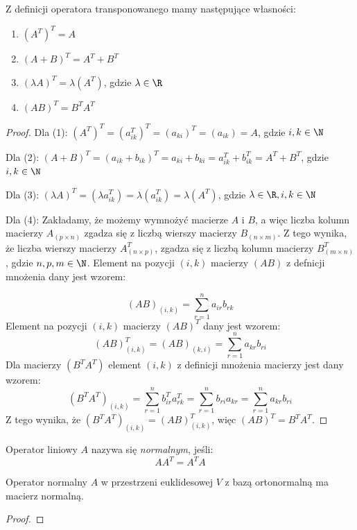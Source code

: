 \begin{theorem}\label{theorem:properties_of_transposed_operator}
    Z definicji operatora transponowanego mamy następujące własności:
    \begin{enumerate}[leftmargin=1cm, itemsep=2pt, label=(\arabic*)]
        \item $(A^T)^T = A$
        \item $(A + B)^T = A^T + B^T$
        \item $(\lambda A)^T = \lambda(A^T)$, gdzie $\lambda \in \R$
        \item $(AB)^T = B^TA^T$
    \end{enumerate}
\end{theorem}
\begin{proof}
Dla (1): $(A^T)^T = (a^T_{ik})^T = (a_{ki})^T = (a_{ik}) = A$, gdzie $i, k \in \N$

Dla (2):
$(A + B)^T = (a_{ik} + b_{ik})^T = a_{ki} + b_{ki} = a^T_{ik} + b^T_{ik} = A^T + B^T$, gdzie $i, k \in \N$

Dla (3):
$(\lambda A)^T = (\lambda a^T_{ik}) = \lambda(a^T_{ik}) = \lambda(A^T)$, gdzie $\lambda \in \R, i, k \in \N$

Dla (4):
Zakładamy, że możemy wymnożyć macierze $A$ i $B$, a więc liczba kolumn macierzy $A_{(p \times n)}$ zgadza się z liczbą wierszy macierzy $B_{(n \times m)}$. Z tego wynika, że liczba wierszy macierzy $A^T_{(n \times p)}$, zgadza się z liczbą kolumn macierzy $B^T_{(m \times n)}$, gdzie $n, p, m \in \N$.
Element na pozycji $(i, k)$ macierzy $(AB)$ z defnicji mnożenia dany jest wzorem: 

$$(AB)_{(i, k)} = \sum_{r=1}^{n}{a_{ir}b_{rk}}$$
Element na pozycji $(i, k)$ macierzy $(AB)^T$ dany jest wzorem:
$$(AB)^T_{(i, k)} = (AB)_{(k, i)} = \sum_{r=1}^{n}{a_{kr}b_{ri}}$$
Dla macierzy $(B^TA^T)$ element $(i, k)$ z definicji mnożenia macierzy jest dany wzorem:
$$(B^TA^T)_{(i, k)} = \sum_{r=1}^{n}{b^T_{ir}a^T_{rk}} = \sum_{r=1}^{n}{b_{ri}a_{kr}} = \sum_{r=1}^{n}{a_{kr}b_{ri}}$$
Z tego wynika, że $(B^TA^T)_{(i, k)} = (AB)^T_{(i, k)}$, więc $(AB)^T = B^TA^T$.

\end{proof}

\begin{definition}\label{def:normal_operator}
Operator liniowy $A$ nazywa się \textit{normalnym}, jeśli:
$$AA^T = A^TA$$
\end{definition}
\begin{theorem}
    Operator normalny $A$ w przestrzeni euklidesowej $V$ z bazą ortonormalną ma macierz normalną.
\end{theorem}
\begin{proof}

\end{proof}

